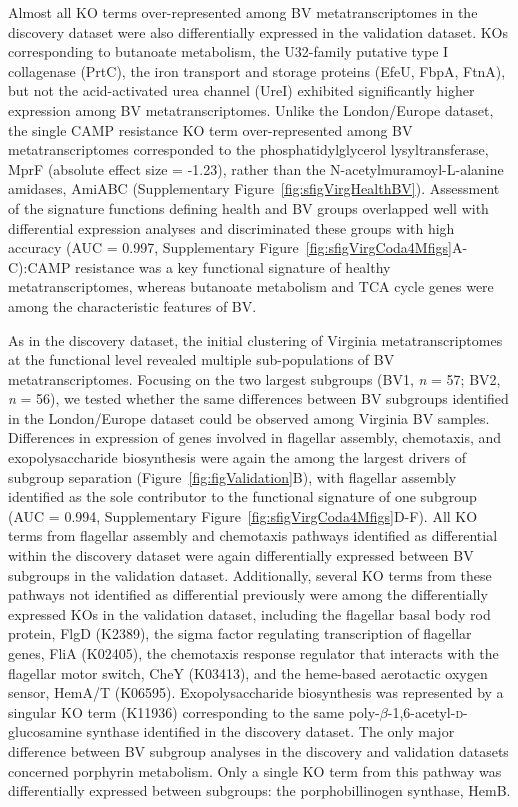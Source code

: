 \documentclass[sn-mathphys,Numbered]{sn-jnl}%
\begin{document}
Almost all KO terms over-represented among BV metatranscriptomes in the discovery dataset were also differentially expressed in the validation dataset. KOs corresponding to butanoate metabolism, the U32-family putative type I collagenase (PrtC), the iron transport and storage proteins (EfeU, FbpA, FtnA), but not the acid-activated urea channel (UreI) exhibited significantly higher expression among BV metatranscriptomes. Unlike the London/Europe dataset, the single CAMP resistance KO term over-represented among BV metatranscriptomes corresponded to the phosphatidylglycerol lysyltransferase, MprF (absolute effect size = -1.23), rather than the N-acetylmuramoyl-L-alanine amidases, AmiABC (Supplementary Figure~\ref{fig:sfigVirgHealthBV}). Assessment of the signature functions defining health and BV groups overlapped well with differential expression analyses and discriminated these groups with high accuracy (AUC = 0.997, Supplementary Figure~\ref{fig:sfigVirgCoda4Mfigs}A-C):CAMP resistance was a key functional signature of healthy metatranscriptomes, whereas butanoate metabolism and TCA cycle genes were among the characteristic features of BV.

As in the discovery dataset, the initial clustering of Virginia metatranscriptomes at the functional level revealed multiple sub-populations of BV metatranscriptomes. Focusing on the two largest subgroups (BV1, \textit{n} = 57; BV2, \textit{n} = 56), we tested whether the same differences between BV subgroups identified in the London/Europe dataset could be observed among Virginia BV samples. Differences in expression of genes involved in flagellar assembly, chemotaxis, and exopolysaccharide biosynthesis were again the among the largest drivers of subgroup separation (Figure~\ref{fig:figValidation}B), with flagellar assembly identified as the sole contributor to the functional signature of one subgroup (AUC = 0.994, Supplementary Figure~\ref{fig:sfigVirgCoda4Mfigs}D-F). All KO terms from flagellar assembly and chemotaxis pathways identified as differential within the discovery dataset were again differentially expressed between BV subgroups in the validation dataset. Additionally, several KO terms from these pathways not identified as differential previously were among the differentially expressed KOs in the validation dataset, including the flagellar basal body rod protein, FlgD (K2389), the sigma factor regulating transcription of flagellar genes, FliA (K02405), the chemotaxis response regulator that interacts with the flagellar motor switch, CheY (K03413), and the heme-based aerotactic oxygen sensor, HemA/T (K06595). Exopolysaccharide biosynthesis was represented by a singular KO term (K11936) corresponding to the same poly-$\beta$-1,6-acetyl-\textsc{d}-glucosamine synthase identified in the discovery dataset. The only major difference between BV subgroup analyses in the discovery and validation datasets concerned porphyrin metabolism. Only a single KO term from this pathway was differentially expressed between subgroups: the porphobillinogen synthase, HemB.
\end{document}

